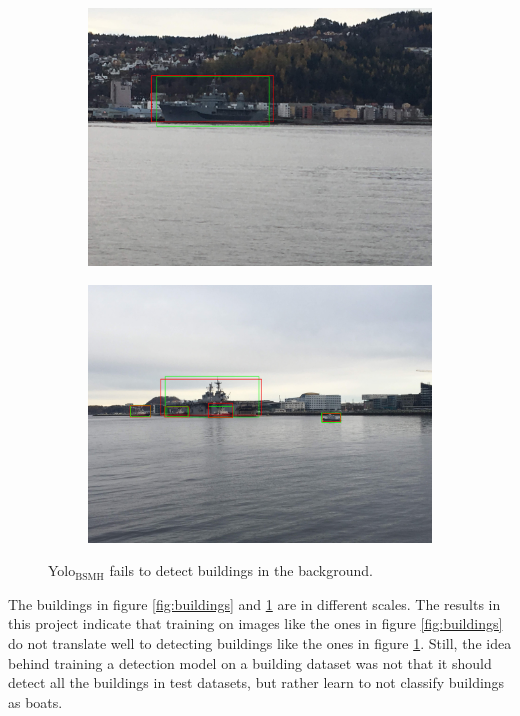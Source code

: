 \begin{figure}[h!]
\begin{subfigure}{.5\textwidth}
  \centering
  \includegraphics[width=0.8\linewidth]{discussion/yolo3_no_build/IMG_2673.jpg}
\end{subfigure}%
\begin{subfigure}{.5\textwidth}
  \centering
  \includegraphics[width=.8\linewidth]{discussion/yolo3_no_build/IMG_2695.jpg}
\end{subfigure}
\caption{Yolo$_{\text{BSMH}}$ fails to detect buildings in the background.}
\label{fig:yolo3_no_build}
\end{figure}

\noindent
The buildings in figure \ref{fig:buildings} and \ref{fig:yolo3_no_build} are in different scales. The results in this project indicate that training on images like the ones in figure \ref{fig:buildings} do not translate well to detecting buildings like the ones in figure \ref{fig:yolo3_no_build}. Still, the idea behind training a detection model on a building dataset was not that it should detect all the buildings in test datasets, but rather learn to not classify buildings as boats. 

